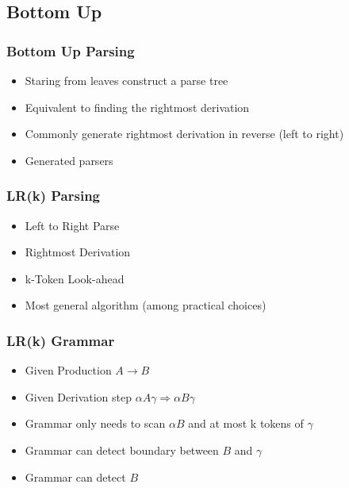 \documentclass[usepdftitle=false,professionalfonts,compress ]{beamer}
\begin{document}
\subsection{Bottom Up}

{
\begin{frame}\frametitle{Bottom Up Parsing}

	\begin{itemize}
	\item Staring from leaves construct a parse tree
			\item Equivalent to finding the rightmost derivation
			\item Commonly generate rightmost derivation in reverse (left to right)
			\item Generated parsers
				\end{itemize}

\end{frame}}






{
\begin{frame}\frametitle{LR(k) Parsing}

	\begin{itemize}
	\item Left to Right Parse
			\item Rightmost Derivation
			\item k-Token Look-ahead
			\item Most general algorithm (among practical choices)
				\end{itemize}

\end{frame}}






{
\begin{frame}\frametitle{LR(k) Grammar}

	\begin{itemize}
	\item Given Production $A \rightarrow B$
			\item Given Derivation step $\alpha A \gamma \Rightarrow \alpha B \gamma$
			\item Grammar only needs to scan $\alpha B$ and at most k tokens of $\gamma$
			\item Grammar can detect boundary between $B$ and $\gamma$
			\item Grammar can detect $B$
				\end{itemize}

\end{frame}}
\end{document}

